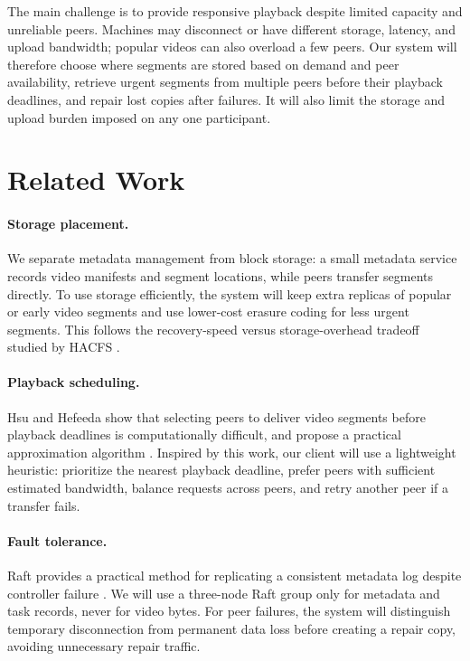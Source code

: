 The main challenge is to provide responsive playback despite limited capacity and unreliable peers. Machines may disconnect or have different storage, latency, and upload bandwidth; popular videos can also overload a few peers. Our system will therefore choose where segments are stored based on demand and peer availability, retrieve urgent segments from multiple peers before their playback deadlines, and repair lost copies after failures. It will also limit the storage and upload burden imposed on any one participant.
\section{Related Work}
\paragraph{Storage placement.} We separate metadata management from block storage: a small metadata service records video manifests and segment locations, while peers transfer segments directly. To use storage efficiently, the system will keep extra replicas of popular or early video segments and use lower-cost erasure coding for less urgent segments. This follows the recovery-speed versus storage-overhead tradeoff studied by HACFS \cite{xia2015tale}.

\paragraph{Playback scheduling.} Hsu and Hefeeda show that selecting peers to deliver video segments before playback deadlines is computationally difficult, and propose a practical approximation algorithm \cite{hsu2010quality}. Inspired by this work, our client will use a lightweight heuristic: prioritize the nearest playback deadline, prefer peers with sufficient estimated bandwidth, balance requests across peers, and retry another peer if a transfer fails.

\paragraph{Fault tolerance.} Raft provides a practical method for replicating a consistent metadata log despite controller failure \cite{ongaro2014raft}. We will use a three-node Raft group only for metadata and task records, never for video bytes. For peer failures, the system will distinguish temporary disconnection from permanent data loss before creating a repair copy, avoiding unnecessary repair traffic.


